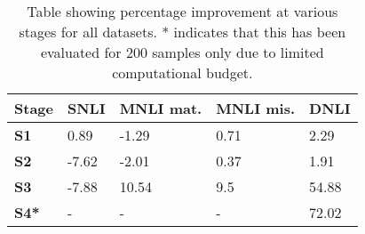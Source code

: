 \begin{table}[t]
    \centering
    \small 
    \begin{tabular}{p{1cm}p{0.9cm}p{0.9cm}p{0.9cm}p{0.9cm}}
    \toprule
        \textbf{Stage} & \textbf{SNLI}  & \textbf{MNLI mat.} &  \textbf{MNLI mis.}  & \textbf{DNLI}\\
        \midrule
        \textbf{S1} & 0.89	& -1.29	& 0.71	& 2.29 \\
        \textbf{S2} &    -7.62	& -2.01	& 0.37	& 1.91 \\
        \textbf{S3} &   -7.88	& 10.54	& 9.5	& 54.88 \\
        \textbf{S4*} &   -	& -	& -	& 72.02 \\
        
    \bottomrule
    \end{tabular}
    \caption{Table showing percentage improvement at various stages for all datasets. * indicates that this has been evaluated for 200 samples only due to limited computational budget.}
    \label{tab:auc_results}
\end{table}
